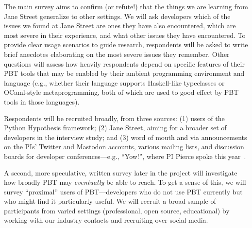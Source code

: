The main survey
aims to confirm (or refute!) that
the things we are learning from Jane Street generalize to other settings.
We will
ask developers which of the issues we found at Jane Street are
ones they have also encountered, which are most severe
in their experience, and what
other issues they have encountered.
To provide
clear usage scenarios to guide research, respondents will
be asked to write brief anecdotes elaborating on the
most severe issues they remember.  Other questions will assess how
heavily respondents depend on specific features of their PBT tools
that may be enabled by their
ambient programming environment and language (e.g., whether their
language supports Haskell-like typeclasses or OCaml-style
metaprogramming, both of which are used to good effect by
PBT tools in those languages).

Respondents will
be recruited broadly, from three sources: (1)
users of the Python Hypothesis framework; (2) Jane Street, aiming for
a broader set of developers in the interview study; and (3)
word of mouth and via announcements on the PIs' Twitter and Mastodon
accounts, various mailing lists, and discussion boards for developer
conferences---e.g., ``Yow!'', where PI Pierce spoke this
year~\cite{Pierce:Yow22}.

A second, more speculative, written survey later in the project will investigate
how broadly PBT may {\em eventually} be able to reach.  To get a sense
of this, we will
survey ``proximal'' users of PBT---developers who do not use PBT
currently but who might find it particularly
useful.
We
will recruit a broad sample of participants from varied settings
(professional, open source, educational) by working with our industry contacts
and recruiting over social media.
%
\iflater {} \fi

